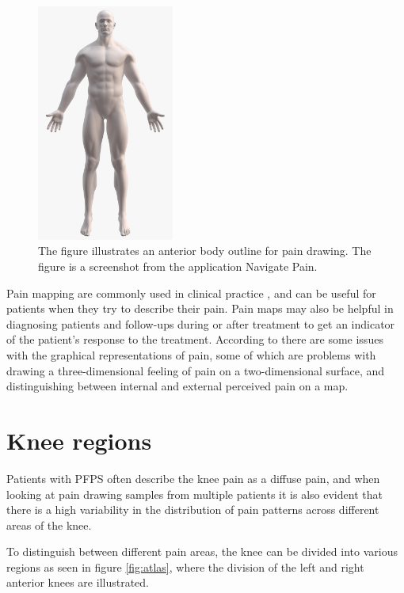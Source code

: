 \begin{figure} [H]
\centering
\includegraphics[width=0.4\textwidth]{figures/painmap}
\caption{The figure illustrates an anterior body outline for pain drawing. The figure is a screenshot from the application Navigate Pain.}
\label{fig:painmap}
\end{figure}

\noindent
Pain mapping are commonly used in clinical practice \citep{Schott2010}, and can be useful for patients when they try to describe their pain. Pain maps may also be helpful in diagnosing patients and follow-ups during or after treatment to get an indicator of the patient’s response to the treatment.\citep{Boudreau2016}
According to \citeauthor{Schott2010} there are some issues with the graphical representations of pain, some of which are problems with drawing a three-dimensional feeling of pain on a two-dimensional surface, and distinguishing between internal and external perceived pain on a map.\citep{Schott2010}

\section{Knee regions}

Patients with PFPS often describe the knee pain as a diffuse pain, and when looking at pain drawing samples from multiple patients it is also evident that there is a high variability in the distribution of pain patterns across different areas of the knee.

\noindent
To distinguish between different pain areas, the knee can be divided into various regions as seen in figure \ref{fig:atlas}, where the division of the left and right anterior knees are illustrated. 

